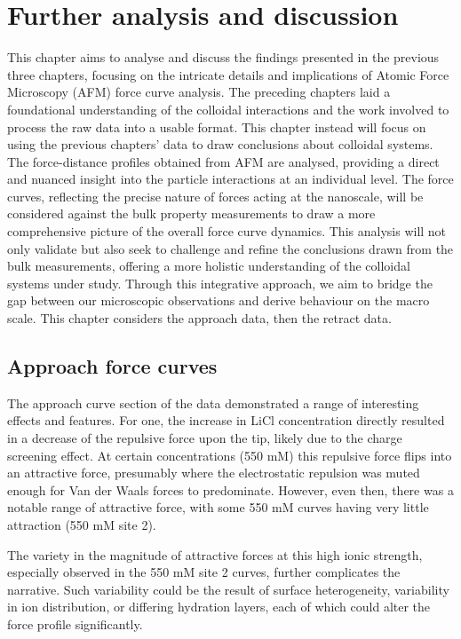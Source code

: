 \chapter{Further analysis and discussion}

This chapter aims to analyse and discuss the findings presented in the previous three chapters, focusing on the intricate details and implications of Atomic Force Microscopy (AFM) force curve analysis. The preceding chapters laid a foundational understanding of the colloidal interactions and the work involved to process the raw data into a usable format. This chapter instead will focus on using the previous chapters' data to draw conclusions about colloidal systems. The force-distance profiles obtained from AFM are analysed, providing a direct and nuanced insight into the particle interactions at an individual level. The force curves, reflecting the precise nature of forces acting at the nanoscale, will be considered against the bulk property measurements to draw a more comprehensive picture of the overall force curve dynamics. This analysis will not only validate but also seek to challenge and refine the conclusions drawn from the bulk measurements, offering a more holistic understanding of the colloidal systems under study. Through this integrative approach, we aim to bridge the gap between our microscopic observations and derive behaviour on the macro scale. This chapter considers the approach data, then the retract data.

\section{Approach force curves}

The approach curve section of the data demonstrated a range of interesting effects and features. For one, the increase in LiCl concentration directly resulted in a decrease of the repulsive force upon the tip, likely due to the charge screening effect. At certain concentrations (550 mM) this repulsive force flips into an attractive force, presumably where the electrostatic repulsion was muted enough for Van der Waals forces to predominate. However, even then, there was a notable range of attractive force, with some 550 mM curves having very little attraction (550 mM site 2). 

The variety in the magnitude of attractive forces at this high ionic strength, especially observed in the 550 mM site 2 curves, further complicates the narrative. Such variability could be the result of surface heterogeneity, variability in ion distribution, or differing hydration layers, each of which could alter the force profile significantly.


